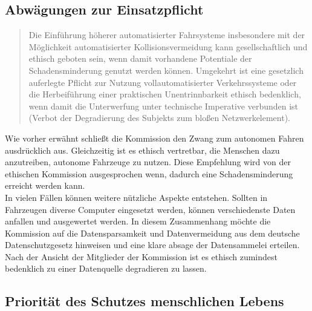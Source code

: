 \documentclass[twoside,a4paper,12pt]{article}
\begin{document}
\subsection{Abwägungen zur Einsatzpflicht} \label{AbwaegungenZurEinsatzpflicht}

\begin{quote}
\glqq
Die Einführung höherer automatisierter Fahrsysteme insbesondere mit der Möglichkeit
automatisierter Kollisionsvermeidung kann gesellschaftlich und ethisch geboten sein,
wenn damit vorhandene Potentiale der Schadensminderung genutzt werden können.
Umgekehrt ist eine gesetzlich auferlegte Pflicht zur Nutzung vollautomatisierter Verkehrssysteme oder die Herbeiführung 
einer praktischen Unentrinnbarkeit ethisch bedenklich, wenn damit die Unterwerfung unter technische Imperative verbunden 
ist (Verbot der Degradierung des Subjekts zum bloßen Netzwerkelement).\grqq\mbox{~\cite[S. 11]{ek}}
\end{quote}
Wie vorher erwähnt schließt die Kommission den Zwang zum autonomen Fahren ausdrücklich aus. Gleichzeitig ist es ethisch vertretbar, die Menschen dazu anzutreiben, autonome Fahrzeuge zu nutzen. Diese Empfehlung wird von der ethischen Kommission ausgesprochen wenn, dadurch eine Schadensminderung erreicht werden kann. \\
In vielen Fällen können weitere nützliche Aspekte entstehen. Sollten in Fahrzeugen diverse Computer eingesetzt werden, können verschiedenste Daten anfallen und ausgewertet werden. In diesem Zusammenhang möchte die Kommission auf die Datensparsamkeit und Datenvermeidung aus dem deutsche Datenschutzgesetz hinweisen und eine klare absage der Datensammelei erteilen. Nach der Ansicht der Mitglieder der Kommission ist es ethisch zumindest bedenklich zu einer Datenquelle degradieren zu lassen.


\subsection{Priorität des Schutzes menschlichen Lebens} \label{PrioritäDesSchutzesMenschlichenLebens}
\end{document}
